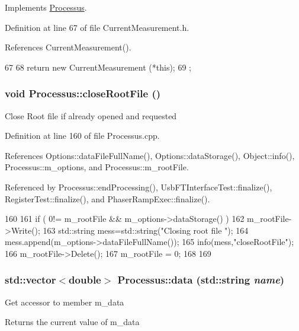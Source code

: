 Implements \hyperlink{classProcessus_aca8856f6d6d7b7e1fe941f298dcbb502}{Processus}.

Definition at line 67 of file CurrentMeasurement.h.

References CurrentMeasurement().


\begin{DoxyCode}
67                              {
68     return new CurrentMeasurement (*this);
69   };
\end{DoxyCode}
\hypertarget{classProcessus_a2f3c41e99da4c738ea3d8f7b0d20a665}{
\subsubsection[{closeRootFile}]{\setlength{\rightskip}{0pt plus 5cm}void Processus::closeRootFile ()}}
\label{classProcessus_a2f3c41e99da4c738ea3d8f7b0d20a665}
Close Root file if already opened and requested 

Definition at line 160 of file Processus.cpp.

References Options::dataFileFullName(), Options::dataStorage(), Object::info(), Processus::m\_\-options, and Processus::m\_\-rootFile.

Referenced by Processus::endProcessing(), UsbFTInterfaceTest::finalize(), RegisterTest::finalize(), and PhaserRampExec::finalize().


\begin{DoxyCode}
160                                 {
161   if ( 0!= m_rootFile && m_options->dataStorage() ){
162     m_rootFile->Write();
163         std::string mess=std::string("Closing root file ");
164         mess.append(m_options->dataFileFullName());
165         info(mess,"closeRootFile");
166     m_rootFile->Delete();
167     m_rootFile = 0;
168   }
169 }
\end{DoxyCode}
\hypertarget{classProcessus_abf4d91fb36707e1d50178bab12d21ae9}{
\subsubsection[{data}]{\setlength{\rightskip}{0pt plus 5cm}std::vector$<$double$>$ Processus::data (std::string {\em name})}}
\label{classProcessus_abf4d91fb36707e1d50178bab12d21ae9}
Get accessor to member m\_\-data \begin{DoxyReturn}{Returns}
the current value of m\_\-data 
\end{DoxyReturn}


